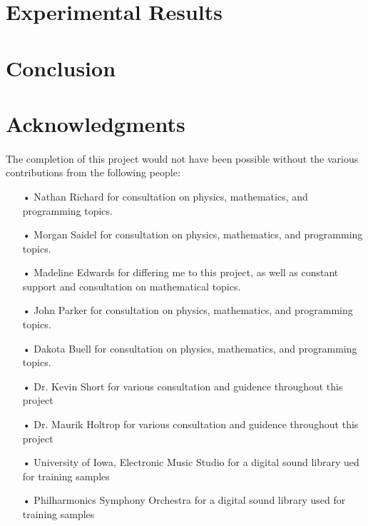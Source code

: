 \documentclass[12pt,letterpaper]{article}
\begin{document}
\newpage
\section{Experimental Results}
\label{sec-Results}



\newpage
\section{Conclusion}
\label{sec-Conclusion}



\newpage
\section{Acknowledgments}
\label{sec-Acknowledge}

\paragraph*{}The completion of this project would not have been possible without the various contributions from the following people:

\begin{itemize}

\item[•]Nathan Richard for consultation on physics, mathematics, and programming topics.

\item[•]Morgan Saidel for consultation on physics, mathematics, and programming topics.

\item[•]Madeline Edwards for differing me to this project, as well as constant support and consultation on mathematical topics.

\item[•]John Parker for consultation on physics, mathematics, and programming topics.

\item[•]Dakota Buell for consultation on physics, mathematics, and programming topics.

\item[•]Dr. Kevin Short for various consultation and guidence throughout this project

\item[•]Dr. Maurik Holtrop for various consultation and guidence throughout this project

\item[•]University of Iowa, Electronic Music Studio for a digital sound library ued for training samples

\item[•]Philharmonics Symphony Orchestra for a digital sound library used for training samples

\end{itemize}
\end{document}
